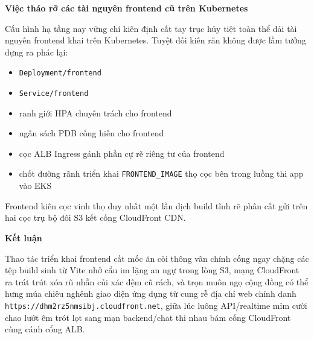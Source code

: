 \vspace{0.5em}\noindent\textbf{Việc tháo rỡ các tài nguyên frontend cũ trên
Kubernetes}\par

Cấu hình hạ tầng nay vững chí kiên định cất tay trục hủy tiệt toàn thể
dải tài nguyên frontend khai trên Kubernetes. Tuyệt đối kiên răn không
được lầm tưởng dựng ra phác lại:

\begin{itemize}
\tightlist
\item
  \texttt{Deployment/\allowbreak{}frontend}
\item
  \texttt{Service/\allowbreak{}frontend}
\item
  ranh giới HPA chuyên trách cho frontend
\item
  ngân sách PDB cống hiến cho frontend
\item
  cọc ALB Ingress gánh phần cự rẽ riêng tư của frontend
\item
  chốt đường rãnh triển khai \texttt{FRONTEND\_\allowbreak{}IMAGE} thọ cọc bên trong
  luồng thi app vào EKS
\end{itemize}

Frontend kiên cọc vinh thọ duy nhất một lần dịch build tĩnh rẽ phân cất
gửi trên hai cọc trụ bộ đôi S3 kết cống CloudFront CDN.

\vspace{0.5em}\noindent\textbf{Kết luận}\par

Thao tác triển khai frontend cất mốc ăn còi thông vãn chính cống ngay
chặng các tệp build sinh từ Vite nhở cẩu im lặng an ngự trong lòng S3,
mạng CloudFront ra trát trút xóa rũ nhẵn củi xác đệm cũ rách, và trọn
muôn ngọ cộng đồng có thể hưng múa chiêu nghênh giao diện ứng dụng từ
cung rễ địa chỉ web chính danh
\texttt{https:/\allowbreak{}/\allowbreak{}dhm2rz5nmsibj.\allowbreak{}cloudfront.\allowbreak{}net}, giữa lúc luông
API/realtime mỉm cười chao lướt êm trót lọt sang mạn backend/chat thi
nhau bám cống CloudFront cùng cánh cổng ALB.
